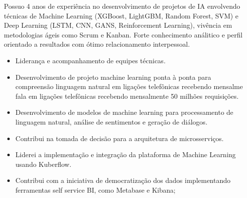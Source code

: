 \documentclass[10pt,a4paper,ragged2e]{altacv}
\begin{document}

\begin{fullwidth}
\makecvheader
\end{fullwidth}




Possuo 4 anos de experiência no desenvolvimento de projetos de IA envolvendo 
técnicas de Machine Learning (XGBoost, LightGBM, Random Forest, SVM) 
e Deep Learning  (LSTM, CNN, GANS, Reinforcement Learning), 
vivência em metodologias ágeis como Scrum e Kanban. 
Forte conhecimento análitico e perfil orientado a resultados com ótimo relacionamento 
interpessoal. 


\begin{itemize}

\item Liderança e acompanhamento de equipes técnicas.

\item Desenvolvimento de projeto machine learning ponta à ponta para compreensão 
      linguagem natural em ligações telefônicas recebendo mensalme
      fala em ligações telefônicas recebendo mensalmente 50 milhões requisições.

\item Desenvolvimento de modelos de machine learning para processamento de 
      linguagem natural, análise de sentimentos e geração de diálogos.

\item Contribui na tomada de decisão para a arquitetura de microsserviços.


\item Liderei a implementação e integração da plataforma de Machine Learning usando 
      Kuberflow.
       
\item Contribui com a iniciativa de democratização dos dados implementando ferramentas
      self service BI, como Metabase e Kibana;

%
\end{itemize}
\end{document}
